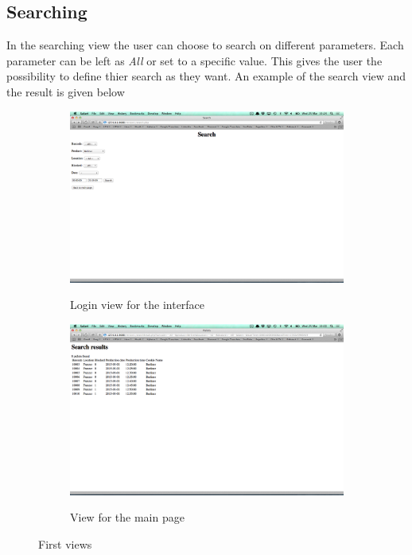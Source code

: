 \documentclass[a4paper]{scrartcl}
\numberwithin{equation}{section}
\begin{document}
\subsection*{Searching}

In the searching view the user can choose to search on different parameters. Each parameter can be left as \emph{All} or set to a specific value. This gives the user the possibility to define thier search as they want. An example of the search view and the result is given below

\begin{figure}[h]
  \centering
  	\begin{subfigure}[b]{0.45\textwidth}
    	\includegraphics[width=\textwidth]{figures/view_search.png}
    	\label{figure:view_search}
    	\caption{Login view for the interface}
 		\end{subfigure}	

 		\begin{subfigure}[b]{0.45\textwidth}
    	\includegraphics[width=\textwidth]{figures/view_searchResult.png}
    	\label{figure:view_searchResult}
    	\caption{View for the main page}
 		\end{subfigure} 
 		\caption{First views}
\end{figure}
\end{document}
